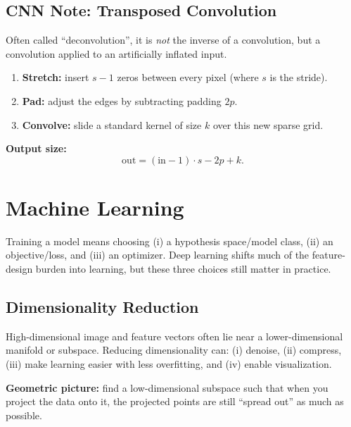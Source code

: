 \documentclass[11pt, oneside]{book}
\begin{document}
\begin{thmbox}[title={Reprojection Error Minimization}]
\begin{defbox}[title={Correlation and Convolution}]
\section{CNN Note: Transposed Convolution}

\begin{thmbox}[title={Transposed Convolution (Learned Upsampling)}]
Often called ``deconvolution'', it is \emph{not} the inverse of a convolution, but a convolution applied to
an artificially inflated input.
\begin{enumerate}
  \item \textbf{Stretch:} insert $s-1$ zeros between every pixel (where $s$ is the stride).
  \item \textbf{Pad:} adjust the edges by subtracting padding $2p$.
  \item \textbf{Convolve:} slide a standard kernel of size $k$ over this new sparse grid.
\end{enumerate}
\textbf{Output size:}
\[
\text{out} = (\text{in}-1)\cdot s - 2p + k.
\]
\end{thmbox}


\chapter{Machine Learning}

Training a model means choosing (i) a hypothesis space/model class, (ii) an objective/loss,
and (iii) an optimizer. Deep learning shifts much of the feature-design burden into learning,
but these three choices still matter in practice.

\section{Dimensionality Reduction}

High-dimensional image and feature vectors often lie near a lower-dimensional manifold or subspace.
Reducing dimensionality can: (i) denoise, (ii) compress, (iii) make learning easier with less overfitting,
and (iv) enable visualization.

\begin{intbox}
\textbf{Geometric picture:} find a low-dimensional subspace such that when you project the data onto it,
the projected points are still ``spread out'' as much as possible.
\end{intbox}


\end{defbox}
\end{thmbox}
\end{document}
